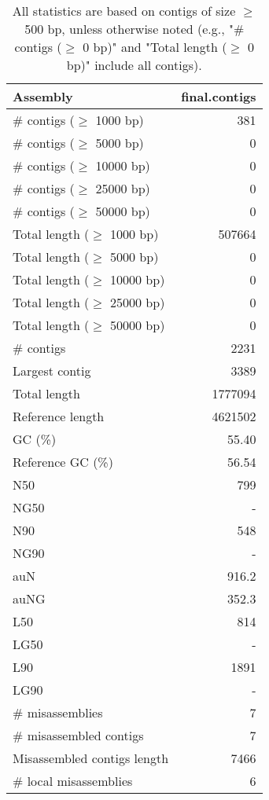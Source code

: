 \documentclass[12pt,a4paper]{article}
\begin{document}
\begin{table}[ht]
\begin{center}
\caption{All statistics are based on contigs of size $\geq$ 500 bp, unless otherwise noted (e.g., "\# contigs ($\geq$ 0 bp)" and "Total length ($\geq$ 0 bp)" include all contigs).}
\begin{tabular}{|l*{1}{|r}|}
\hline
Assembly & final.contigs \\ \hline
\# contigs ($\geq$ 1000 bp) & 381 \\ \hline
\# contigs ($\geq$ 5000 bp) & 0 \\ \hline
\# contigs ($\geq$ 10000 bp) & 0 \\ \hline
\# contigs ($\geq$ 25000 bp) & 0 \\ \hline
\# contigs ($\geq$ 50000 bp) & 0 \\ \hline
Total length ($\geq$ 1000 bp) & 507664 \\ \hline
Total length ($\geq$ 5000 bp) & 0 \\ \hline
Total length ($\geq$ 10000 bp) & 0 \\ \hline
Total length ($\geq$ 25000 bp) & 0 \\ \hline
Total length ($\geq$ 50000 bp) & 0 \\ \hline
\# contigs & 2231 \\ \hline
Largest contig & 3389 \\ \hline
Total length & 1777094 \\ \hline
Reference length & 4621502 \\ \hline
GC (\%) & 55.40 \\ \hline
Reference GC (\%) & 56.54 \\ \hline
N50 & 799 \\ \hline
NG50 & - \\ \hline
N90 & 548 \\ \hline
NG90 & - \\ \hline
auN & 916.2 \\ \hline
auNG & 352.3 \\ \hline
L50 & 814 \\ \hline
LG50 & - \\ \hline
L90 & 1891 \\ \hline
LG90 & - \\ \hline
\# misassemblies & 7 \\ \hline
\# misassembled contigs & 7 \\ \hline
Misassembled contigs length & 7466 \\ \hline
\# local misassemblies & 6 \\ \hline

\end{tabular}
\end{center}
\end{table}
\end{document}
